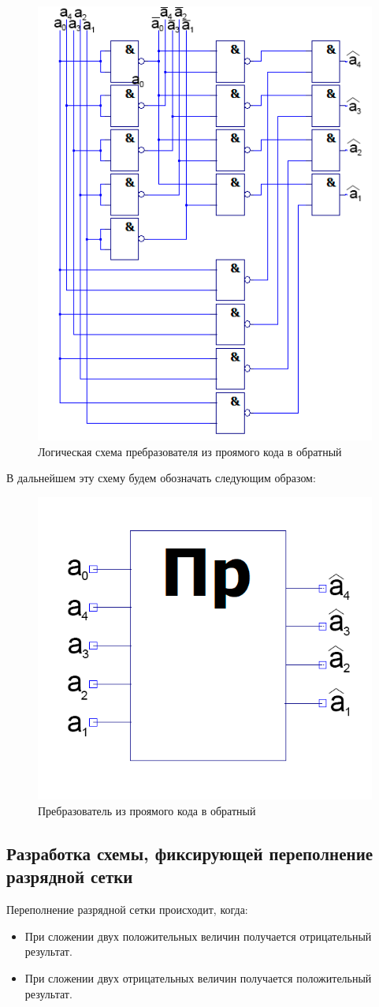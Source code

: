 \documentclass[a4paper,14pt]{article}
\begin{document}
\begin{figure}[H]
	\centering
	\includegraphics[width=0.6\linewidth]{images/preobr_sh}
	\caption{Логическая схема пребразователя из проямого кода в обратный}
	\label{fig:preobr_sh}
\end{figure}

В дальнейшем эту схему будем обозначать следующим образом:

\begin{figure}[H]
	\centering
	\includegraphics[width=0.4\linewidth]{images/preobr_el}
	\caption{Пребразователь из проямого кода в обратный}
	\label{fig:preobr_el}
\end{figure}

\subsection{Разработка схемы, фиксирующей переполнение разрядной сетки}

Переполнение разрядной сетки происходит, когда:
\begin{itemize}
	\item При сложении двух положительных величин получается отрицательный результат.
	
	\item При сложении двух отрицательных величин получается положительный результат.	
\end{itemize}
\end{document}
